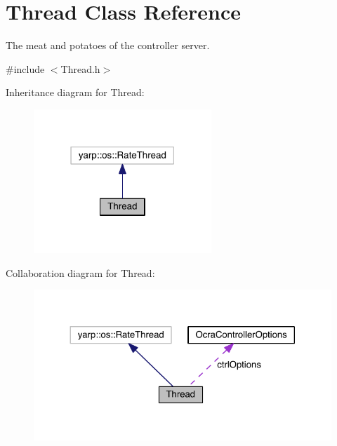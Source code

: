 \hypertarget{classThread}{}\section{Thread Class Reference}
\label{classThread}


The meat and potatoes of the controller server.  




{\ttfamily \#include $<$Thread.\+h$>$}



Inheritance diagram for Thread\+:\nopagebreak
\begin{figure}[H]
\begin{center}
\leavevmode
\includegraphics[width=190pt]{classThread__inherit__graph}
\end{center}
\end{figure}


Collaboration diagram for Thread\+:\nopagebreak
\begin{figure}[H]
\begin{center}
\leavevmode
\includegraphics[width=324pt]{classThread__coll__graph}
\end{center}
\end{figure}
